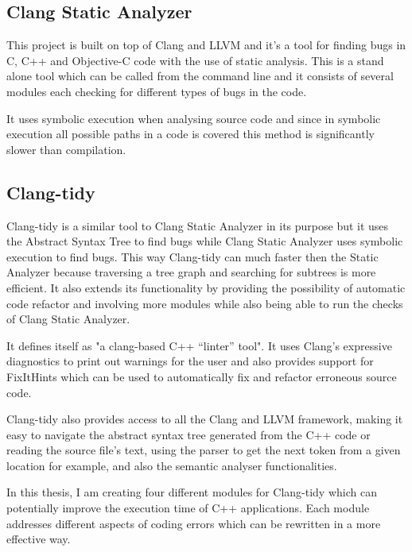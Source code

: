 \subsection{Clang Static Analyzer}
\par This project is built on top of Clang and LLVM and it's a tool for finding bugs in C, C++ and Objective-C code with the use of static analysis. This is a stand alone tool which can be called from the command line and it consists of several modules each checking for different types of bugs in the code.
\par It uses symbolic execution when analysing source code and since in symbolic execution all possible paths in a code is covered this method is significantly slower than compilation. 
\subsection{Clang-tidy}
\par Clang-tidy is a similar tool to Clang Static Analyzer in its purpose but it uses the Abstract Syntax Tree to find bugs while Clang Static Analyzer uses symbolic execution to find bugs. This way Clang-tidy can much faster then the Static Analyzer because traversing a tree graph and searching for subtrees is more efficient. It also extends its functionality by providing the possibility of automatic code refactor and involving more modules while also being able to run the checks of Clang Static Analyzer.\medskip
\par It defines itself as "a clang-based C++ “linter” tool"\cite{clang_tidy_mainpage}. It uses Clang's expressive diagnostics to print out warnings for the user and also provides support for FixItHints which can be used to automatically fix and refactor erroneous source code. \medskip
\par Clang-tidy also provides access to all the Clang and LLVM framework, making it easy to navigate the abstract syntax tree generated from the C++ code or reading the source file's text, using the parser to get the next token from a given location for example, and also the semantic analyser functionalities.\medskip
\par In this thesis, I am creating four different modules for Clang-tidy which can potentially improve the execution time of C++ applications. Each module addresses different aspects of coding errors which can be rewritten in a more effective way.

